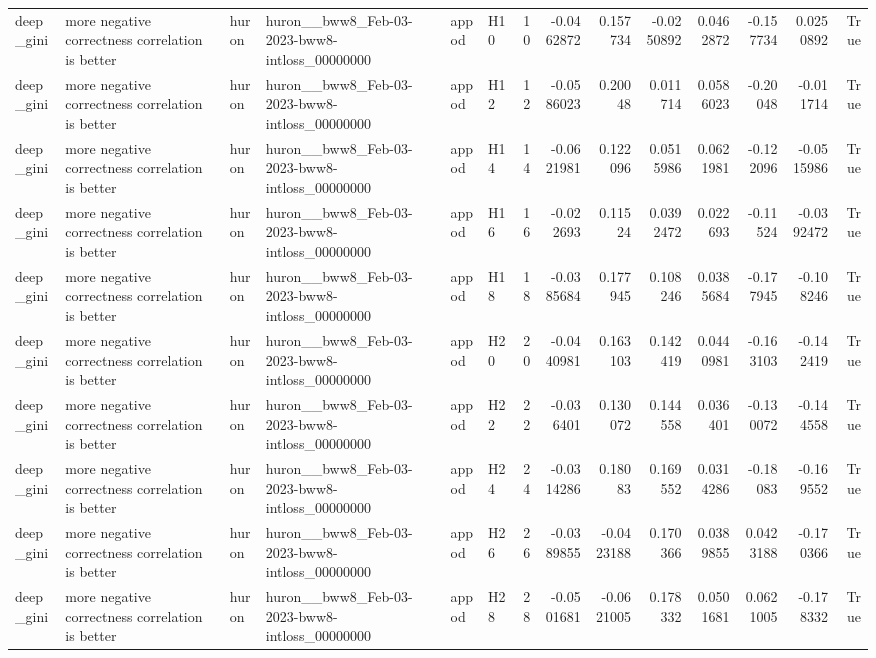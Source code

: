 \begin{longtable}{llllllrrrrrrrr}
deep\_gini & more negative correctness correlation is better & huron & huron\_\_bww8\_Feb-03-2023-bww8-intloss\_00000000 & appod & H10 & 10 & -0.0462872 & 0.157734 & -0.0250892 & 0.0462872 & -0.157734 & 0.0250892 & True \\
deep\_gini & more negative correctness correlation is better & huron & huron\_\_bww8\_Feb-03-2023-bww8-intloss\_00000000 & appod & H12 & 12 & -0.0586023 & 0.20048 & 0.011714 & 0.0586023 & -0.20048 & -0.011714 & True \\
deep\_gini & more negative correctness correlation is better & huron & huron\_\_bww8\_Feb-03-2023-bww8-intloss\_00000000 & appod & H14 & 14 & -0.0621981 & 0.122096 & 0.0515986 & 0.0621981 & -0.122096 & -0.0515986 & True \\
deep\_gini & more negative correctness correlation is better & huron & huron\_\_bww8\_Feb-03-2023-bww8-intloss\_00000000 & appod & H16 & 16 & -0.022693 & 0.11524 & 0.0392472 & 0.022693 & -0.11524 & -0.0392472 & True \\
deep\_gini & more negative correctness correlation is better & huron & huron\_\_bww8\_Feb-03-2023-bww8-intloss\_00000000 & appod & H18 & 18 & -0.0385684 & 0.177945 & 0.108246 & 0.0385684 & -0.177945 & -0.108246 & True \\
deep\_gini & more negative correctness correlation is better & huron & huron\_\_bww8\_Feb-03-2023-bww8-intloss\_00000000 & appod & H20 & 20 & -0.0440981 & 0.163103 & 0.142419 & 0.0440981 & -0.163103 & -0.142419 & True \\
deep\_gini & more negative correctness correlation is better & huron & huron\_\_bww8\_Feb-03-2023-bww8-intloss\_00000000 & appod & H22 & 22 & -0.036401 & 0.130072 & 0.144558 & 0.036401 & -0.130072 & -0.144558 & True \\
deep\_gini & more negative correctness correlation is better & huron & huron\_\_bww8\_Feb-03-2023-bww8-intloss\_00000000 & appod & H24 & 24 & -0.0314286 & 0.18083 & 0.169552 & 0.0314286 & -0.18083 & -0.169552 & True \\
deep\_gini & more negative correctness correlation is better & huron & huron\_\_bww8\_Feb-03-2023-bww8-intloss\_00000000 & appod & H26 & 26 & -0.0389855 & -0.0423188 & 0.170366 & 0.0389855 & 0.0423188 & -0.170366 & True \\
deep\_gini & more negative correctness correlation is better & huron & huron\_\_bww8\_Feb-03-2023-bww8-intloss\_00000000 & appod & H28 & 28 & -0.0501681 & -0.0621005 & 0.178332 & 0.0501681 & 0.0621005 & -0.178332 & True \\

\end{longtable}
